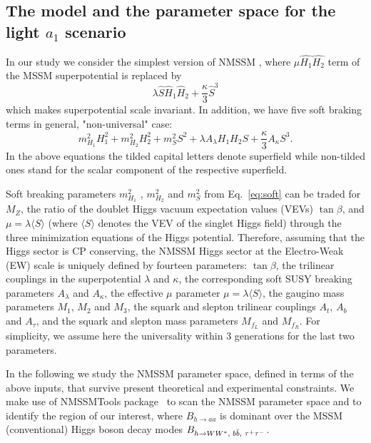 \documentclass[aps,12pt,superscriptaddress,nofootinbib,floatfix,showpacs]{revtex4}
\begin{document}
\subsection{The model and the parameter space for  the light $a_1$ scenario}
In our study we consider the simplest version of NMSSM
\cite{Nilles:1982dy,Frere:1983ag,Ellis:1988er,%
Drees:1988fc,Ellwanger:1993hn,Ellwanger:1993xa,%
Elliott:1993bs,Pandita:1993tg,Ellwanger:1995ru,%
King:1995vk,Franke:1995tc,Ellwanger:1996gw},
where $\mu\widehat{H_1}\widehat{H_2}$ term of the 
MSSM superpotential is replaced by
\begin{equation}
\lambda  \widehat{S} \widehat{H}_1 \widehat{H}_2 + \frac{\kappa}{3}  \widehat{S}^3 
\label{eq:superpot} 
\end{equation}
which makes superpotential scale invariant. In addition, we have five
soft braking terms in general,  "non-universal" case:
\begin{equation}
  m_{H_1}^2 H_1^2 + m_{H_2}^2 H_2^2  + m_{S}^2 S^2 
+ \lambda A_\lambda H_1 H_2 S +  \frac{\kappa}{3} A_\kappa S^3.
\label{eq:soft} 
\end{equation}
In the above equations the tilded capital letters denote superfield
while non-tilded ones stand for the scalar component of the respective
superfield.


Soft breaking parameters
$m_{H_1}^2$ , $m_{H_2}^2$  and $m_{S}^2$ 
from Eq.~\ref{eq:soft} can  be traded for 
$M_Z$, the ratio  of the doublet Higgs vacuum expectation values (VEVs) $\tan\beta$,
and $\mu = \lambda \langle S \rangle$
(where $\langle S \rangle$ denotes the VEV of the singlet Higgs field)
through the three minimization equations of the Higgs potential.
Therefore, 
assuming that the Higgs sector is CP conserving,
the NMSSM Higgs sector at the Electro-Weak (EW) scale is uniquely defined
by fourteen parameters:
$\tan\beta$,
the trilinear couplings in the superpotential $\lambda$ and $\kappa$, the
corresponding soft SUSY breaking parameters $A_\lambda$ and $A_\kappa$,
the effective $\mu$ parameter $\mu = \lambda \langle S \rangle$,
the gaugino mass parameters $M_1$, $M_2$ and $M_3$,
the squark and slepton trilinear couplings
$A_{t}$,  $A_{b}$ and  $A_\tau$,
and the squark and slepton mass parameters $M_{f_L}$ and $M_{f_R}$.
For simplicity, we assume here the
universality within 3 generations for the last two parameters.



In the following we study the NMSSM parameter space, defined
in terms of the above inputs, that survive present theoretical and 
experimental constraints. 
We make use of NMSSMTools
package~\cite{nmssmtools1,nmssmtools2,nmssmtools3} to scan the NMSSM
parameter space and to identify the region of our interest,
where $B_{h \to aa}$  is dominant over
the MSSM (conventional) Higgs boson decay modes
$B_{h \to WW^*\mbox{\scriptsize, } b\bar{b}\mbox{\scriptsize, }\tau^+\tau^-}$.
\end{document}
